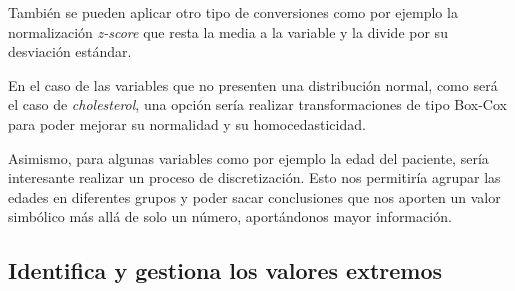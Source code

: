 \documentclass[
]{article}
\newenvironment{Shaded}{\begin{snugshade}}{\end{snugshade}}
\newcommand{\AttributeTok}[1]{\textcolor[rgb]{0.77,0.63,0.00}{#1}}
\newcommand{\DecValTok}[1]{\textcolor[rgb]{0.00,0.00,0.81}{#1}}
\newcommand{\FunctionTok}[1]{\textcolor[rgb]{0.00,0.00,0.00}{#1}}
\newcommand{\NormalTok}[1]{#1}
\newcommand{\OtherTok}[1]{\textcolor[rgb]{0.56,0.35,0.01}{#1}}
\newcommand{\SpecialCharTok}[1]{\textcolor[rgb]{0.00,0.00,0.00}{#1}}
\newcommand{\StringTok}[1]{\textcolor[rgb]{0.31,0.60,0.02}{#1}}
\begin{document}
\begin{Shaded}
\end{Shaded}

También se pueden aplicar otro tipo de conversiones como por ejemplo la
normalización \emph{z-score} que resta la media a la variable y la
divide por su desviación estándar.

En el caso de las variables que no presenten una distribución normal,
como será el caso de \emph{cholesterol}, una opción sería realizar
transformaciones de tipo Box-Cox para poder mejorar su normalidad y su
homocedasticidad.

Asimismo, para algunas variables como por ejemplo la edad del paciente,
sería interesante realizar un proceso de discretización. Esto nos
permitiría agrupar las edades en diferentes grupos y poder sacar
conclusiones que nos aporten un valor simbólico más allá de solo un
número, aportándonos mayor información.

\hypertarget{identifica-y-gestiona-los-valores-extremos}{%
\subsection{Identifica y gestiona los valores
extremos}\label{identifica-y-gestiona-los-valores-extremos}}
\end{document}
